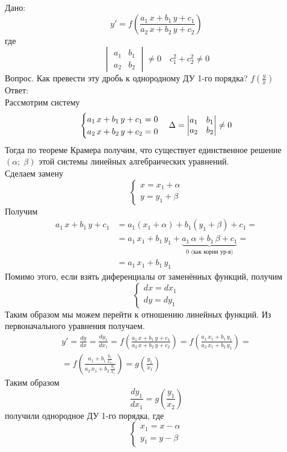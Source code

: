 \begin{Note}
    Дано:
    \[
        y' = f\left(\frac{a_1\,x + b_1\,y + c_1}{a_2\,x + b_2\,y + c_2}\right)
    \]
    где 
    \[
        \begin{vmatrix} a_1 & b_1 \\ a_2 & b_2\end{vmatrix} \neq 0 \quad c_1^2 + c_2^2 \neq 0
    \]
    Вопрос. Как превести эту дробь к однородному ДУ 1-го порядка? $f\left(\frac{y}{x}\right)$\\
    Ответ:\\
    Рассмотрим систему
    \[
        \begin{cases}
            a_1\,x + b_1\,y + c_1 = 0\\
            a_2\,x + b_2\,y + c_2 = 0
        \end{cases} \Delta = \begin{vmatrix} a_1 & b_1 \\ a_2 & b_2\end{vmatrix} \neq 0\\
    \]
    Тогда по теореме Крамера получим, что существует единственное решение $(\alpha;\; \beta)$ этой системы линейных алгебраических уравнений.\\
    Сделаем замену
    \[
    \begin{cases}
        x = x_1 + \alpha\\
        y = y_1 + \beta
    \end{cases}
    \]
    Получим
    \begin{align*}
        a_1\,x + b_1\,y + c_1 &= a_1(x_1 + \alpha) + b_1(y_1 + \beta) + c_1 = \\
        &=a_1\,x_1 + b_1\,y_1 + \underbrace{a_1\,\alpha + b_1\,\beta + c_1}_{0 \text{ (как корни ур-я)}} = \\
        &=a_1\,x_1 + b_1\,y_1
    \end{align*}
    Помимо этого, если взять диференциалы от заменённых функций, получим
    \[
        \begin{cases}
            dx = dx_1\\
            dy = dy_1
        \end{cases}
    \]
    Таким образом мы можем перейти к отношению линейных функций. Из первоначального уравнения получаем.
    \begin{multline*}
        y' = \frac{dy}{dx} = \frac{dy_1}{dx_1} = f\left(\frac{a_1\,x + b_1\,y + c_1}{a_2\,x +  b_2\,y + c_2}\right) = f\left(\frac{a_1\,x_1 +  b_1\,y_1}{a_2\,x_1 + b_2\,y_1}\right) =\\
        = f\left(\frac{a_1 +  b_1\,\frac{y_1}{x_1}}{a_2\,x_1 + b_2\,\frac{y_1}{x_1}}\right) = g\left(\frac{y_1}{x_1}\right)
    \end{multline*}
    Таким образом
    \[
        \frac{dy_1}{dx_1} = g\left(\frac{y_1}{x_2}\right)
    \]
    получили однородное ДУ 1-го порядка, где 
    \[
        \begin{cases}
            x_1 = x - \alpha\\
            y_1 = y - \beta
        \end{cases}
    \]
\end{Note}

